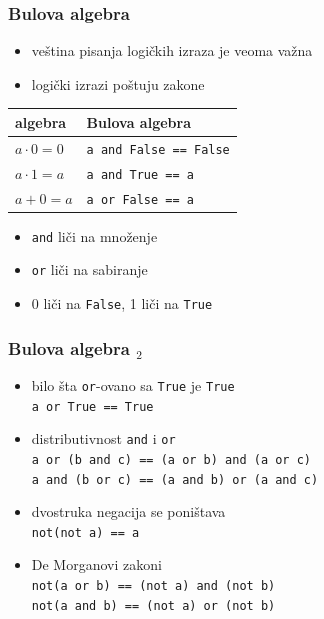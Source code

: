 \documentclass[utf8,compress]{beamer}
\begin{document}
\begin{frame}[fragile]
  \frametitle{Bulova algebra}
  \begin{itemize}
    \item veština pisanja logičkih izraza je veoma važna
    \item logički izrazi poštuju zakone 
  \end{itemize}
  \begin{center}
  \begin{tabular}{l|l}
    \textbf{algebra} & \textbf{Bulova algebra} \\ \hline
    $a\cdot 0 = 0$ & \texttt{a and False == False} \\ \hline
    $a\cdot 1 = a$ & \texttt{a and True == a} \\ \hline
    $a + 0 = a$ & \texttt{a or False == a}
  \end{tabular}
  \end{center}
  \begin{itemize}
    \item \texttt{and} liči na množenje
    \item \texttt{or} liči na sabiranje
    \item 0 liči na \texttt{False}, 1 liči na \texttt{True}
  \end{itemize}
\end{frame}

\begin{frame}[fragile]
  \frametitle{Bulova algebra $_2$}
  \begin{itemize}
    \item bilo šta \texttt{or}-ovano sa \texttt{True} je \texttt{True} \\
      \texttt{a or True == True}
    \item distributivnost \texttt{and} i \texttt{or} \\
      \texttt{a or (b and c) == (a or b) and (a or c)} \\
      \texttt{a and (b or c) == (a and b) or (a and c)}
    \item dvostruka negacija se poništava \\
      \texttt{not(not a) == a}
    \item De Morganovi zakoni \\
      \texttt{not(a or b) == (not a) and (not b)} \\
      \texttt{not(a and b) == (not a) or (not b)}
  \end{itemize}
\end{frame}
\end{document}
